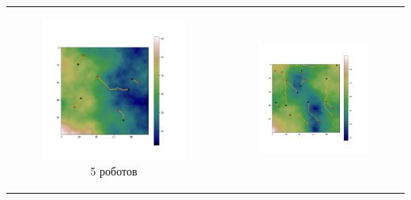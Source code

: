 \documentclass{article}
\begin{document}
	\begin{table}[H]
		\begin{tabular}{c c}
			\begin{subfigure}{0.5\linewidth}
				\includegraphics[width = 1.0\columnwidth]{data/mean_paths/100x100/5.png}
			\caption*{5 роботов}
			\end{subfigure}
			&
			\begin{subfigure}{0.5\linewidth}
				\includegraphics[width = 1.0\columnwidth]{data/mean_paths/100x100/10.png}

\end{subfigure}
\end{tabular}
\end{table}
\end{document}
